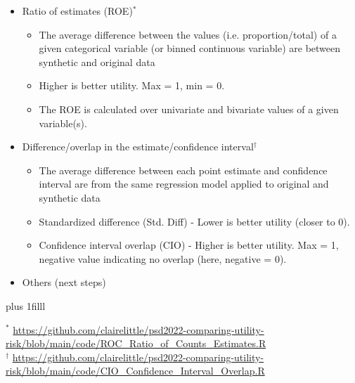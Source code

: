 \documentclass[t,8pt,utfx8]{beamer}
\newcommand{\btVFill}{\vskip0pt plus 1filll}
\begin{document}
\begin{spacing}{1.25}
{\begin{itemize}
    \item Ratio of estimates (ROE)$^*$ 
    \begin{itemize}
        \item The average difference between the values (i.e. proportion/total) of a given categorical variable (or binned continuous variable) are between synthetic and original data
        \item Higher is better utility.  Max = 1, min = 0.  
        \item The ROE is calculated over univariate and  bivariate values of a given variable(s).  
    \end{itemize}
    \item Difference/overlap in the estimate/confidence interval$^\dagger$
    \begin{itemize}
        \item The average difference between each point estimate and confidence interval are from the same regression model applied to original and synthetic data
        \item Standardized difference (Std. Diff) - Lower is better utility (closer to 0).
        \item Confidence interval overlap (CIO) - Higher is better utility.  Max = 1, negative value indicating no overlap (here, negative = 0).
    \end{itemize}
    \item Others (next steps)
\end{itemize}
\btVFill
\tiny

$^*$ \url{https://github.com/clairelittle/psd2022-comparing-utility-risk/blob/main/code/ROC_Ratio_of_Counts_Estimates.R} \\
$^\dagger$ \url{https://github.com/clairelittle/psd2022-comparing-utility-risk/blob/main/code/CIO_Confidence_Interval_Overlap.R}

}

\end{spacing}
\end{document}
